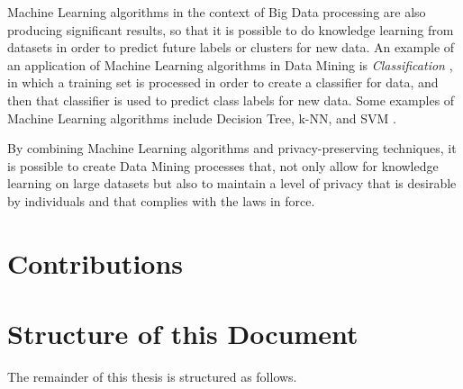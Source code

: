 Machine Learning algorithms in the context of Big Data processing are also producing significant results, so that it is possible to do knowledge learning from datasets in order to predict future labels or clusters for new data. An example of an application of Machine Learning algorithms in Data Mining is \textit{Classification} \cite{LeiXu2014}, in which a training set is processed in order to create a classifier for data, and then that classifier is used to predict class labels for new data. Some examples of Machine Learning algorithms include Decision Tree, \ac{k-NN}, and \ac{SVM} \cite{LeiXu2014}.


By combining Machine Learning algorithms and privacy-preserving techniques, it is possible to create Data Mining processes that, not only allow for knowledge learning on large datasets but also to maintain a level of privacy that is desirable by individuals and that complies with the laws in force.



\section{Contributions}
\label{sec:Intro_Contributions}


\section{Structure of this Document}
\label{sec:Intro_StructureOfThisDocument}
The remainder of this thesis is structured as follows.

